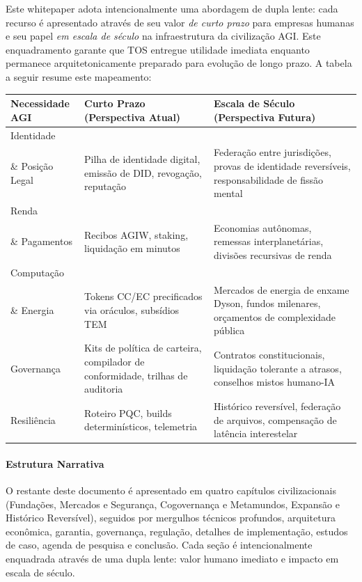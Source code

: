 \documentclass[11pt]{article}
\begin{document}
Este whitepaper adota intencionalmente uma abordagem de dupla lente: cada recurso é apresentado através de seu valor \emph{de curto prazo} para empresas humanas e seu papel \emph{em escala de século} na infraestrutura da civilização AGI. Este enquadramento garante que TOS entregue utilidade imediata enquanto permanece arquitetonicamente preparado para evolução de longo prazo. A tabela a seguir resume este mapeamento:

\begin{longtable}{@{}p{}p{}p{}@{}}
\toprule
\textbf{Necessidade AGI} & \textbf{Curto Prazo (Perspectiva Atual)} & \textbf{Escala de Século (Perspectiva Futura)} \\\midrule
Identidade \\ \& Posição Legal & Pilha de identidade digital, emissão de DID, revogação, reputação & Federação entre jurisdições, provas de identidade reversíveis, responsabilidade de fissão mental \\
Renda \\ \& Pagamentos & Recibos AGIW, staking, liquidação em minutos & Economias autônomas, remessas interplanetárias, divisões recursivas de renda \\
Computação \\ \& Energia & Tokens CC/EC precificados via oráculos, subsídios TEM & Mercados de energia de enxame Dyson, fundos milenares, orçamentos de complexidade pública \\
Governança & Kits de política de carteira, compilador de conformidade, trilhas de auditoria & Contratos constitucionais, liquidação tolerante a atrasos, conselhos mistos humano-IA \\
Resiliência & Roteiro PQC, builds determinísticos, telemetria & Histórico reversível, federação de arquivos, compensação de latência interestelar \\\bottomrule
\end{longtable}

\paragraph{Estrutura Narrativa} O restante deste documento é apresentado em quatro capítulos civilizacionais (Fundações, Mercados e Segurança, Cogovernança e Metamundos, Expansão e Histórico Reversível), seguidos por mergulhos técnicos profundos, arquitetura econômica, garantia, governança, regulação, detalhes de implementação, estudos de caso, agenda de pesquisa e conclusão. Cada seção é intencionalmente enquadrada através de uma dupla lente: valor humano imediato e impacto em escala de século.
\end{document}
